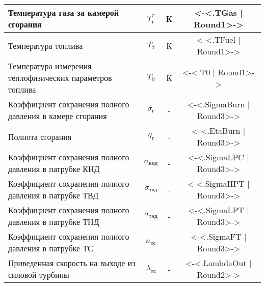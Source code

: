 \begin{center}
\begin{longtable}{|p{7cm}|c|c|c|}
		Температура газа за камерой сгорания & $T_г^*$ & К & <-<.TGas | Round1>-> \\ \hline
		Температура топлива & $T_{т}$ & К & <-<.TFuel | Round1>-> \\ \hline
		Температура измерения теплофизических параметров топлива & $T_0$ & К & <-<.T0 | Round1>-> \\ \hline
		Коэффициент сохранения полного давления в камере сгорания & $\sigma_{г}$ & - & <-<.SigmaBurn | Round3>-> \\ \hline
		Полнота сгорания & $\eta_{г}$ & - & <-<.EtaBurn | Round3>-> \\ \hline
		Коэффициент сохранения полного давления в патрубке КНД & $\sigma_{кнд}$ & - & <-<.SigmaLPC | Round3>-> \\ \hline
		Коэффициент сохранения полного давления в патрубке ТВД & $\sigma_{твд}$ & - & <-<.SigmaHPT | Round3>-> \\ \hline
		Коэффициент сохранения полного давления в патрубке ТНД & $\sigma_{тнд}$ & - & <-<.SigmaLPT | Round3>-> \\ \hline
		Коэффициент сохранения полного давления в патрубке ТС & $\sigma_{тс}$ & - & <-<.SigmaFT | Round3>-> \\ \hline
		Приведенная скорость на выходе из силовой турбины & $\lambda_{тс}$ & - & <-<.LambdaOut | Round2>-> \\ \hline
	\end{longtable}
\end{center}

%